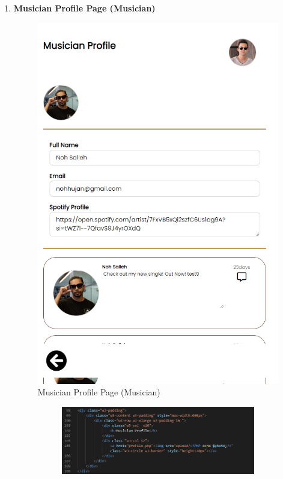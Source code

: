 \begin{enumerate}[1.]
    \item \textbf{Musician Profile Page (Musician)}
    \begin{figure}[h]
        \centering
        \includegraphics[width=0.5\linewidth]{mainmatter/images/frontend/ss/Musician Profile (Musician).png}
        \caption{Musician Profile Page (Musician)}
        \label{fig:myfig57}
    \end{figure}
    \begin{figure}[h]\ContinuedFloat
        \centering
        \begin{subfigure}[b]{0.7\textwidth}
            \centering
            \includegraphics[width=\textwidth]{mainmatter/images/frontend/code/mprofile.png}
            \label{fig:sub1}
        \end{subfigure}
        \hspace{0.04\textwidth}
        \begin{subfigure}[b]{0.7\textwidth}
            \centering

\end{subfigure}
\end{figure}
\end{enumerate}
